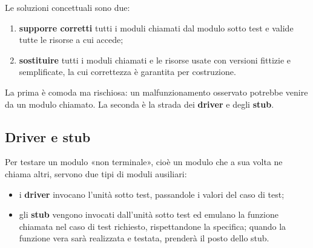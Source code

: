 Le soluzioni concettuali sono due:

\begin{enumerate}
  \item \textbf{supporre corretti} tutti i moduli chiamati dal modulo sotto test e valide tutte le risorse a cui accede;
  \item \textbf{sostituire} tutti i moduli chiamati e le risorse usate con versioni fittizie e semplificate, la cui
        correttezza è garantita per costruzione.
\end{enumerate}

La prima è comoda ma rischiosa: un malfunzionamento osservato potrebbe venire da un modulo chiamato. La seconda è la
strada dei \textbf{driver} e degli \textbf{stub}.

\subsection{Driver e stub}

Per testare un modulo «non terminale», cioè un modulo che a sua volta ne chiama altri, servono due tipi di moduli
ausiliari:

\begin{itemize}
  \item i \textbf{driver} invocano l'unità sotto test, passandole i valori del caso di test;
  \item gli \textbf{stub} vengono invocati dall'unità sotto test ed emulano la funzione chiamata nel caso di test
        richiesto, rispettandone la specifica; quando la funzione vera sarà realizzata e testata, prenderà il posto
        dello stub.
\end{itemize}

\begin{center}
\end{center}

